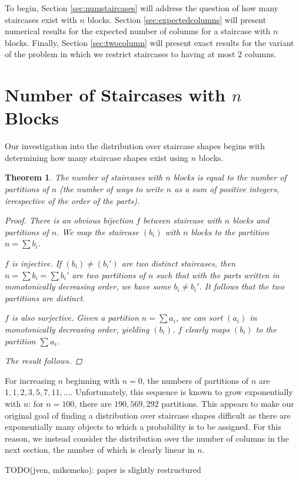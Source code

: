 \documentclass[12pt]{amsart}
\newtheorem{theorem}{Theorem}[section]
\newcommand{\newsection}[2]{
\section{#1 \label{#2}}
}
\begin{document}
To begin, Section \ref{sec:numstaircases} will address the question of how many staircases exist with $n$ blocks. Section \ref{sec:expectedcolumns} will present numerical results for the expected number of columns for a staircase with $n$ blocks. Finally, Section \ref{sec:twocolumn} will present exact results for the variant of the problem in which we restrict staircases to having at most $2$ columns.

\newsection{Number of Staircases with $n$ Blocks}{sec:numstaircases}
Our investigation into the distribution over staircase shapes begins with determining how many staircase shapes exist using $n$ blocks.

\begin{theorem}
The number of staircases with $n$ blocks is equal to the number of partitions of $n$ (the number of ways to write $n$ as a sum of positive integers, irrespective of the order of the parts).
\begin{proof}
There is an obvious bijection $f$ between staircase with $n$ blocks and partitions of $n$. We map the staircase $(b_i)$ with $n$ blocks to the partition $n=\sum b_i$.

$f$ is injective. If $(b_i)\neq (b_i')$ are two distinct staircases, then $n = \sum b_i = \sum b_i'$ are two partitions of $n$ such that with the parts written in monotonically decreasing order, we have some $b_i\neq b_i'$. It follows that the two partitions are distinct.

$f$ is also surjective. Given a partition $n = \sum a_i$, we can sort $(a_i)$ in monotonically decreasing order, yielding $(b_i)$. $f$ clearly maps $(b_i)$ to the partition $\sum a_i$.

The result follows.
\end{proof}
\end{theorem}

For increasing $n$ beginning with $n = 0$, the numbers of partitions of $n$ are $1, 1, 2, 3, 5, 7, 11, \ldots$. Unfortunately, this sequence is known to grow exponentially with $n$: for $n = 100$, there are $190,569,292$ partitions. This appears to make our original goal of finding a distribution over staircase shapes difficult as there are exponentially many objects to which a probability is to be assigned. For this reason, we instead consider the distribution over the number of columns in the next section, the number of which is clearly linear in $n$.

TODO(jven, mikemeko): paper is slightly restructured
\end{document}
